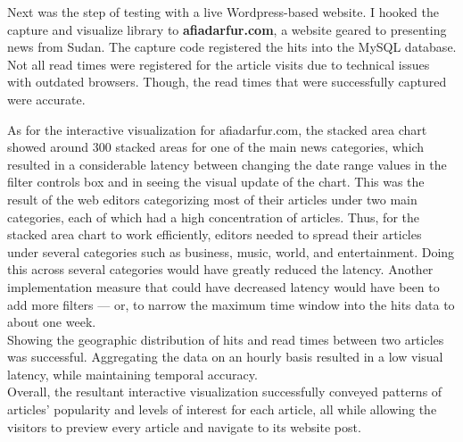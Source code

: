 \documentclass[12pt]{article}
\begin{document}
{Next was the step of testing with a live Wordpress-based website. I hooked the capture and visualize library to \textbf{afiadarfur.com}, a website geared to presenting news from Sudan. The capture code registered the hits into the MySQL database. Not all read times were registered for the article visits due to technical issues with outdated browsers. Though, the read times that were successfully captured were accurate. 
  
As for the interactive visualization for afiadarfur.com, the stacked area chart showed around 300 stacked areas for one of the main news categories, which resulted in a considerable latency between changing the date range values in the filter controls box and in seeing the visual update of the chart. This was the result of the web editors categorizing most of their articles under two main categories, each of which had a high concentration of articles. Thus, for the stacked area chart to work efficiently, editors needed to spread their articles under several categories such as business, music, world, and entertainment. Doing this across several categories would have greatly reduced the latency. Another implementation measure that could have decreased latency would have been to add more filters --- or, to narrow the maximum time window into the hits data to about one week. \\
Showing the geographic distribution of hits and read times between two articles was successful. Aggregating the data on an hourly basis resulted in a low visual latency, while maintaining temporal accuracy. \\

Overall, the resultant interactive visualization successfully conveyed patterns of articles' popularity and levels of interest for each article, all while allowing the visitors to preview every article and navigate to its website post.

\newpage

}
\end{document}
